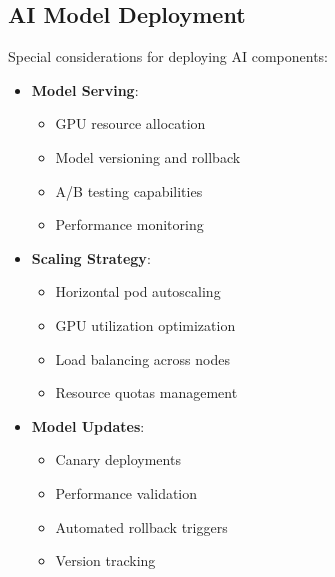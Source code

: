\subsection{AI Model Deployment}

Special considerations for deploying AI components:

\begin{itemize}
    \item \textbf{Model Serving}:
    \begin{itemize}
        \item GPU resource allocation
        \item Model versioning and rollback
        \item A/B testing capabilities
        \item Performance monitoring
    \end{itemize}

    \item \textbf{Scaling Strategy}:
    \begin{itemize}
        \item Horizontal pod autoscaling
        \item GPU utilization optimization
        \item Load balancing across nodes
        \item Resource quotas management
    \end{itemize}

    \item \textbf{Model Updates}:
    \begin{itemize}
        \item Canary deployments
        \item Performance validation
        \item Automated rollback triggers
        \item Version tracking
    \end{itemize}
\end{itemize}
